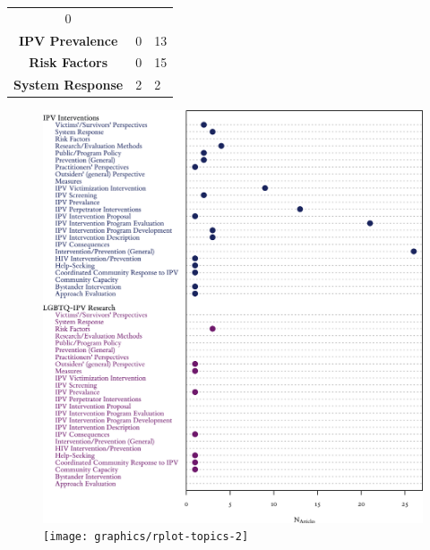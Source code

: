 \documentclass[]{tufte-handout}
\begin{document}
\begin{longtable}[]{@{}cll@{}}
\begin{minipage}[t]{0.22\columnwidth}
0\strut
\end{minipage}\tabularnewline
\begin{minipage}[t]{0.47\columnwidth}\centering\strut
\textbf{IPV Prevalence}\strut
\end{minipage} & \begin{minipage}[t]{0.22\columnwidth}\raggedright\strut
0\strut
\end{minipage} & \begin{minipage}[t]{0.22\columnwidth}\raggedright\strut
13\strut
\end{minipage}\tabularnewline
\begin{minipage}[t]{0.47\columnwidth}\centering\strut
\textbf{Risk Factors}\strut
\end{minipage} & \begin{minipage}[t]{0.22\columnwidth}\raggedright\strut
0\strut
\end{minipage} & \begin{minipage}[t]{0.22\columnwidth}\raggedright\strut
15\strut
\end{minipage}\tabularnewline
\begin{minipage}[t]{0.47\columnwidth}\centering\strut
\textbf{System Response}\strut
\end{minipage} & \begin{minipage}[t]{0.22\columnwidth}\raggedright\strut
2\strut
\end{minipage} & \begin{minipage}[t]{0.22\columnwidth}\raggedright\strut
2\strut
\end{minipage}\tabularnewline
\bottomrule
\end{longtable}

\begin{figure}
\includegraphics[width=\linewidth]{graphics/rplot-topics-1} \texttt{[image: graphics/rplot-topics-2]} \end{figure}
\end{document}

